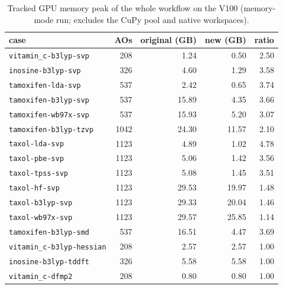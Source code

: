 \begin{table}[!htbp]
\centering
\small
\begin{tabular}{lrrrr}
\toprule
case & AOs & original (GB) & new (GB) & ratio \\
\midrule
\texttt{vitamin\_c-b3lyp-svp} & 208 & 1.24 & 0.50 & 2.50 \\
\texttt{inosine-b3lyp-svp} & 326 & 4.60 & 1.29 & 3.58 \\
\texttt{tamoxifen-lda-svp} & 537 & 2.42 & 0.65 & 3.74 \\
\texttt{tamoxifen-b3lyp-svp} & 537 & 15.89 & 4.35 & 3.66 \\
\texttt{tamoxifen-wb97x-svp} & 537 & 15.93 & 5.20 & 3.07 \\
\texttt{tamoxifen-b3lyp-tzvp} & 1042 & 24.30 & 11.57 & 2.10 \\
\texttt{taxol-lda-svp} & 1123 & 4.89 & 1.02 & 4.78 \\
\texttt{taxol-pbe-svp} & 1123 & 5.06 & 1.42 & 3.56 \\
\texttt{taxol-tpss-svp} & 1123 & 5.08 & 1.45 & 3.51 \\
\texttt{taxol-hf-svp} & 1123 & 29.53 & 19.97 & 1.48 \\
\texttt{taxol-b3lyp-svp} & 1123 & 29.33 & 20.04 & 1.46 \\
\texttt{taxol-wb97x-svp} & 1123 & 29.57 & 25.85 & 1.14 \\
\texttt{tamoxifen-b3lyp-smd} & 537 & 16.51 & 4.47 & 3.69 \\
\texttt{vitamin\_c-b3lyp-hessian} & 208 & 2.57 & 2.57 & 1.00 \\
\texttt{inosine-b3lyp-tddft} & 326 & 5.58 & 5.58 & 1.00 \\
\texttt{vitamin\_c-dfmp2} & 208 & 0.80 & 0.80 & 1.00 \\
\bottomrule
\end{tabular}
\caption{Tracked GPU memory peak of the whole workflow on the V100 (memory-mode run; excludes the CuPy pool and native workspaces).}
\label{tab:memory}
\end{table}
